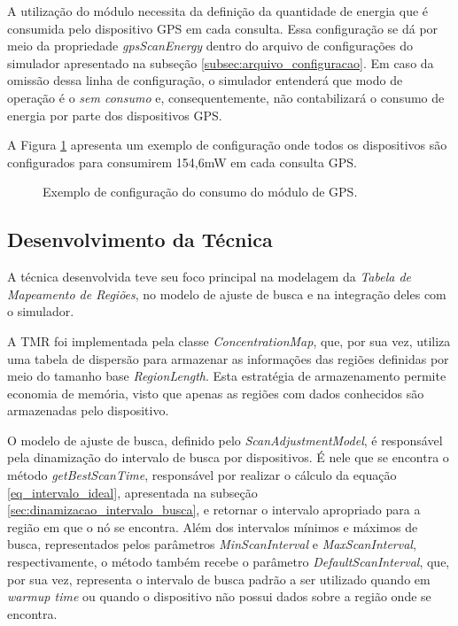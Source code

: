 A utilização do módulo necessita da definição da quantidade de energia que é consumida pelo dispositivo GPS em cada consulta. Essa configuração se dá por meio da propriedade \emph{gpsScanEnergy} dentro do arquivo de configurações do simulador apresentado na subseção \ref{subsec:arquivo_configuracao}. Em caso da omissão dessa linha de configuração, o simulador entenderá que modo de operação é o \emph{sem consumo} e, consequentemente, não contabilizará o consumo de energia por parte dos dispositivos GPS.

A Figura \ref{gps_config} apresenta um exemplo de configuração onde todos os dispositivos são configurados para consumirem 154,6mW em cada consulta GPS.

\begin{figure}[htp!]
\centering

\caption{Exemplo de configuração do consumo do módulo de GPS.}
\label{gps_config}
\end{figure}

\subsection{Desenvolvimento da Técnica}

A técnica desenvolvida teve seu foco principal na modelagem da \emph{Tabela de Mapeamento de Regiões}, no modelo de ajuste de busca e na integração deles com o simulador.

A TMR foi implementada pela classe \emph{ConcentrationMap}, que, por sua vez, utiliza uma tabela de dispersão para armazenar as informações das regiões definidas por meio do tamanho base \emph{RegionLength}. Esta estratégia de armazenamento permite economia de memória, visto que apenas as regiões com dados conhecidos são armazenadas pelo dispositivo.

O modelo de ajuste de busca, definido pelo \emph{ScanAdjustmentModel}, é responsável pela dinamização do intervalo de busca por dispositivos. É nele que se encontra o método \emph{getBestScanTime}, responsável por realizar o cálculo da equação \ref{eq_intervalo_ideal}, apresentada na subseção \ref{sec:dinamizacao_intervalo_busca}, e retornar o intervalo apropriado para a região em que o nó se encontra. Além dos intervalos mínimos e máximos de busca, representados pelos parâmetros \emph{MinScanInterval} e \emph{MaxScanInterval}, respectivamente, o método também recebe o parâmetro \emph{DefaultScanInterval}, que, por sua vez, representa o intervalo de busca padrão a ser utilizado quando em \emph{warmup time} ou quando o dispositivo não possui dados sobre a região onde se encontra.

